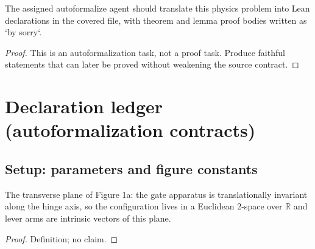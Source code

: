 \begin{theorem}
\label{thm:physics:IPhO_2026_1_A_1:target}
The assigned autoformalize agent should translate this physics problem into Lean declarations in the covered file, with theorem and lemma proof bodies written as `by sorry`.
\end{theorem}
\begin{proof}
This is an autoformalization task, not a proof task. Produce faithful statements that can later be proved without weakening the source contract.
\end{proof}


\section*{Declaration ledger (autoformalization contracts)}

\subsection*{Setup: parameters and figure constants}

\begin{definition}
\label{def:IPhO2026Problems_problem_IPhO_2026_1_A_1:GatePlane}
The transverse plane of Figure 1a: the gate apparatus is translationally
invariant along the hinge axis, so the configuration lives in a Euclidean
2-space over $\mathbb{R}$ and lever arms are intrinsic vectors of this plane.
\end{definition}
\begin{proof}
Definition; no claim.
\end{proof}

